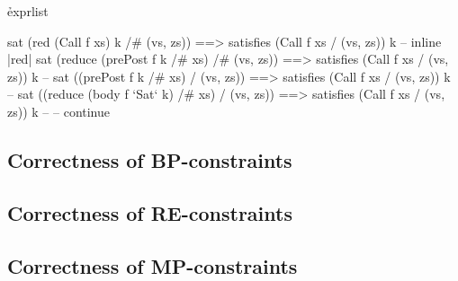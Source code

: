 
\h{exprlist}\begin{code}
sat (red (Call f xs) k /# (vs, zs)) ==> satisfies (Call f xs / (vs, zs)) k
    -- inline |red|
sat (reduce (prePost f k /# xs) /# (vs, zs)) ==> satisfies (Call f xs / (vs, zs)) k
    -- 
sat ((prePost f k /# xs) / (vs, zs)) ==> satisfies (Call f xs / (vs, zs)) k
    -- 
sat ((reduce (body f `Sat` k) /# xs) / (vs, zs)) ==> satisfies (Call f xs / (vs, zs)) k
    -- 
    -- continue
\end{code}





\subsection{Correctness of BP-constraints}


\subsection{Correctness of RE-constraints}


\subsection{Correctness of MP-constraints}

